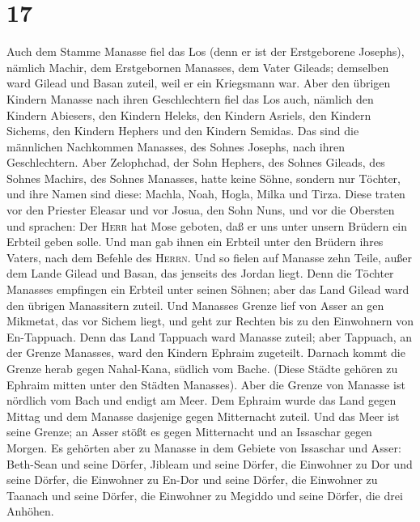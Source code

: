 \hypertarget{section-16}{%
\section{17}\label{section-16}}

 Auch dem Stamme Manasse fiel das Los (denn er ist der
Erstgeborene Josephs), nämlich Machir, dem Erstgebornen Manasses, dem
Vater Gileads; demselben ward Gilead und Basan zuteil, weil er ein
Kriegsmann war.  Aber den übrigen Kindern Manasse nach
ihren Geschlechtern fiel das Los auch, nämlich den Kindern Abiesers, den
Kindern Heleks, den Kindern Asriels, den Kindern Sichems, den Kindern
Hephers und den Kindern Semidas. Das sind die männlichen Nachkommen
Manasses, des Sohnes Josephs, nach ihren Geschlechtern. 
Aber Zelophchad, der Sohn Hephers, des Sohnes Gileads, des Sohnes
Machirs, des Sohnes Manasses, hatte keine Söhne, sondern nur Töchter,
und ihre Namen sind diese: Machla, Noah, Hogla, Milka und Tirza.
 Diese traten vor den Priester Eleasar und vor Josua, den
Sohn Nuns, und vor die Obersten und sprachen: Der \textsc{Herr} hat Mose
geboten, daß er uns unter unsern Brüdern ein Erbteil geben solle. Und
man gab ihnen ein Erbteil unter den Brüdern ihres Vaters, nach dem
Befehle des \textsc{Herrn}.  Und so fielen auf Manasse
zehn Teile, außer dem Lande Gilead und Basan, das jenseits des Jordan
liegt.  Denn die Töchter Manasses empfingen ein Erbteil
unter seinen Söhnen; aber das Land Gilead ward den übrigen Manassitern
zuteil.  Und Manasses Grenze lief von Asser an gen
Mikmetat, das vor Sichem liegt, und geht zur Rechten bis zu den
Einwohnern von En-Tappuach.  Denn das Land Tappuach ward
Manasse zuteil; aber Tappuach, an der Grenze Manasses, ward den Kindern
Ephraim zugeteilt.  Darnach kommt die Grenze herab gegen
Nahal-Kana, südlich vom Bache. (Diese Städte gehören zu Ephraim mitten
unter den Städten Manasses). Aber die Grenze von Manasse ist nördlich
vom Bach und endigt am Meer.  Dem Ephraim wurde das Land
gegen Mittag und dem Manasse dasjenige gegen Mitternacht zuteil. Und das
Meer ist seine Grenze; an Asser stößt es gegen Mitternacht und an
Issaschar gegen Morgen.  Es gehörten aber zu Manasse in
dem Gebiete von Issaschar und Asser: Beth-Sean und seine Dörfer, Jibleam
und seine Dörfer, die Einwohner zu Dor und seine Dörfer, die Einwohner
zu En-Dor und seine Dörfer, die Einwohner zu Taanach und seine Dörfer,
die Einwohner zu Megiddo und seine Dörfer, die drei Anhöhen.
